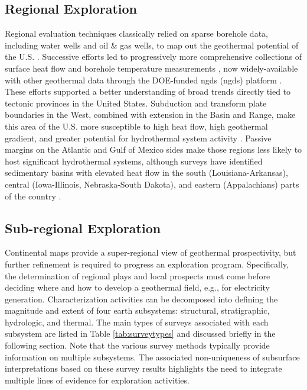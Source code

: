 \subsection{Regional Exploration}
Regional evaluation techniques classically relied on sparse borehole data, including water wells and oil \& gas wells, to map out the geothermal potential of the U.S. \citep{kehle_aapg_1970}. Successive efforts led to progressively more comprehensive collections of surface heat flow and borehole temperature measurements \citep{blackwell_temperature-at-depth_2011, blackwell_heat_1990, muffler_assessment_1979, sorey_low-temperature_1983, wisian_heat_1999}, now widely-available with other geothermal data through the DOE-funded \acrlong{ngds} (\acrshort{ngds}) platform \citep{anderson_national_2013}. These efforts supported a better understanding of broad trends directly tied to tectonic provinces in the United States. Subduction and transform plate boundaries in the West, combined with extension in the Basin and Range, make this area of the U.S. more susceptible to high heat flow, high geothermal gradient, and greater potential for hydrothermal system activity \citep{mariner_low-temperature_1983}. Passive margins on the Atlantic and Gulf of Mexico sides make those regions less likely to host significant hydrothermal systems, although surveys have identified sedimentary basins with elevated heat flow in the south (Louisiana-Arkansas), central (Iowa-Illinois, Nebraska-South Dakota), and eastern (Appalachians) parts of the country \citep{blackwell_geothermal_1995, sorey_low-temperature_1983}.

\subsection{Sub-regional Exploration}
Continental maps provide a super-regional view of geothermal prospectivity, but further refinement is required to progress an exploration program. Specifically, the determination of regional plays and local prospects must come before deciding where and how to develop a geothermal field, e.g., for electricity generation. Characterization activities can be decomposed into defining the magnitude and extent of four earth subsystems: structural, stratigraphic, hydrologic, and thermal. The main types of surveys associated with each subsystem are listed in Table \ref{tab:surveytypes} and discussed briefly in the following section. Note that the various survey methods typically provide information on multiple subsystems. The associated non-uniqueness of subsurface interpretations based on these survey results highlights the need to integrate multiple lines of evidence for exploration activities. 

